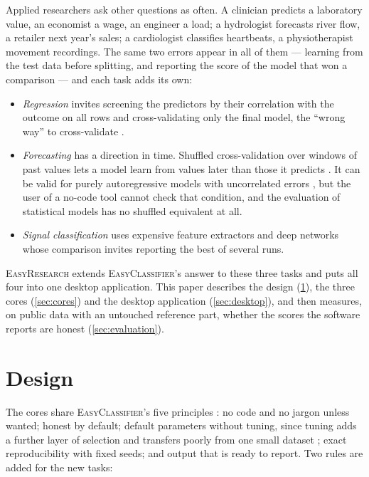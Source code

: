 \documentclass[11pt,a4paper]{article}
\newcommand{\ER}{\textsc{EasyResearch}}
\newcommand{\EC}{\textsc{EasyClassifier}}
\begin{document}
Applied researchers ask other questions as often. A clinician predicts a laboratory value, an economist a wage, an engineer a load; a hydrologist forecasts river flow, a retailer next year's sales; a cardiologist classifies heartbeats, a physiotherapist movement recordings. The same two errors appear in all of them --- learning from the test data before splitting, and reporting the score of the model that won a comparison \citep{varma2006bias,cawley2010overfitting} --- and each task adds its own:
\begin{itemize}
  \item \emph{Regression} invites screening the predictors by their correlation with the outcome on all rows and cross-validating only the final model, the ``wrong way'' to cross-validate \citep{hastie2009esl}.
  \item \emph{Forecasting} has a direction in time. Shuffled cross-validation over windows of past values lets a model learn from values later than those it predicts \citep{tashman2000,bergmeir2012cv}. It can be valid for purely autoregressive models with uncorrelated errors \citep{bergmeir2018note}, but the user of a no-code tool cannot check that condition, and the evaluation of statistical models has no shuffled equivalent at all.
  \item \emph{Signal classification} uses expensive feature extractors and deep networks whose comparison invites reporting the best of several runs.
\end{itemize}

\ER{} extends \EC's answer to these three tasks and puts all four into one desktop application. This paper describes the design (\cref{sec:design}), the three cores (\cref{sec:cores}) and the desktop application (\cref{sec:desktop}), and then measures, on public data with an untouched reference part, whether the scores the software reports are honest (\cref{sec:evaluation}).

\section{Design}
\label{sec:design}

The cores share \EC's five principles \citep{hassanat2026easyclassifierpaper}: no code and no jargon unless wanted; honest by default; default parameters without tuning, since tuning adds a further layer of selection and transfers poorly from one small dataset \citep{probst2019tunability}; exact reproducibility with fixed seeds; and output that is ready to report. Two rules are added for the new tasks:
\end{document}
